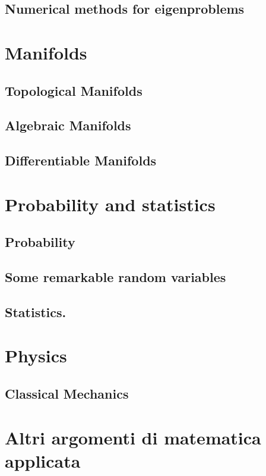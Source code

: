 \documentclass{book}
\begin{document}
	\chapter{Numerical methods for eigenproblems}
	
	\part{Manifolds}
	\chapter{Topological Manifolds}
	
	\chapter{Algebraic Manifolds}
	
	\chapter{Differentiable Manifolds}
	
  \part{Probability and statistics}
	\chapter{Probability}
	
  \chapter{Some remarkable random variables}
  
  \chapter{Statistics.}
  
	\part{Physics}
  \chapter{Classical Mechanics}
	
	\part{Altri argomenti di matematica applicata}
\end{document}
